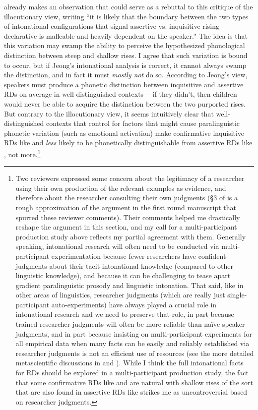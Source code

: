 \documentclass[output=paper,colorlinks,citecolor=brown]{langscibook}
\begin{document}
	\citet[313, 327]{jeong18} already makes an observation that could serve as a rebuttal to this critique of the illocutionary view, writing ``it is likely that the boundary between the two types of intonational configurations that signal assertive vs. inquisitive rising declarative is malleable and heavily dependent on the speaker." The idea is that this variation may swamp the ability to perceive the hypothesized phonological distinction between steep and shallow rises. I agree that such variation is bound to occur, but if Jeong's intonational analysis is correct, it cannot always swamp the distinction, and in fact it must \emph{mostly not} do so. According to Jeong's view, speakers must produce a phonetic distinction between inquisitive and assertive RDs on average in well distinguished contexts~-- if they didn't, then children would never be able to acquire the distinction between the two purported rises. But contrary to the illocutionary view, it seems intuitively clear that well-distinguished contexts that control for factors that might cause paralinguistic phonetic variation (such as emotional activation) make confirmative inquisitive RDs like  and  \emph{less} likely to be phonetically distinguishable from assertive RDs like , not more.\footnote{Two reviewers expressed some concern about the legitimacy of a researcher using their own production of the relevant examples as evidence, and therefore about the researcher consulting their own judgments (\S3 of \citealt{goodhue21:lsa} is a rough approximation of the argument in the first round manuscript that spurred these reviewer comments). Their comments helped me drastically reshape the argument in this section, and my call for a multi-participant production study above reflects my partial agreement with them. Generally speaking, intonational research will often need to be conducted via multi-participant experimentation because fewer researchers have confident judgments about their tacit intonational knowledge (compared to other linguistic knowledge), and because it can be challenging to tease apart gradient paralinguistic prosody and linguistic intonation. That said, like in other areas of linguistics, researcher judgments (which are really just single-participant auto-experiments) have always played a crucial role in intonational research and we need to preserve that role, in part because trained researcher judgments will often be more reliable than na\"ive speaker judgments, and in part because insisting on multi-participant experiments for all empirical data when many facts can be easily and reliably established via researcher judgments is not an efficient use of resources (see the more detailed metascientific discussions in \citealt{phillips09} and \citealt{jacobson18}). While I think the full intonational facts for RDs should be explored in a multi-participant production study, the fact that some confirmative RDs like  and  are natural with shallow rises of the sort that are also found in assertive RDs like  strikes me as uncontroversial based on researcher judgments.} 
	
\end{document}
